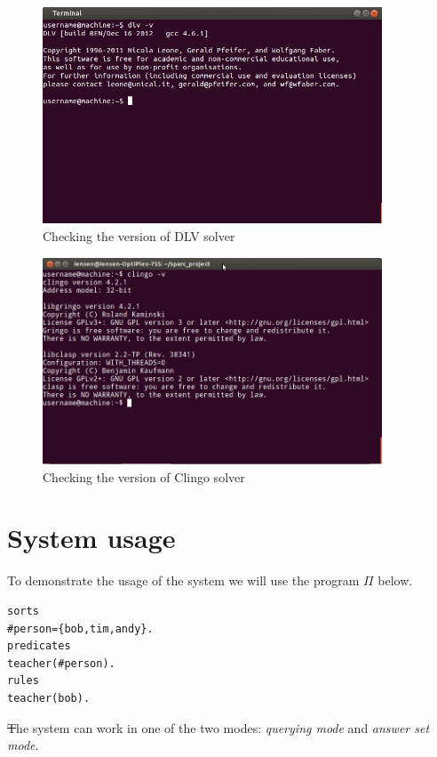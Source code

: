 \documentclass[12pt, letterpaper]{article}
\begin{document}
\begin{figure}[p]
\centering
\includegraphics[width=0.9\textwidth]{dlv_version.jpg}
\caption{Checking the version of DLV solver}
\label{fig:dlv_solver_check}
\end{figure}


\begin{figure}[p]
\centering
\includegraphics[width=0.9\textwidth]{clingo_version.jpg}
\caption{Checking the version of Clingo solver}
\label{fig:clingo_solver_check}
\end{figure}

\section{System usage}

To demonstrate the usage of the system we will use the program $\Pi$ below.
\begin{verbatim}
sorts
#person={bob,tim,andy}.
predicates
teacher(#person).
rules
teacher(bob).
\end{verbatim}

\st
The system can work in one of the  two modes: \textit{querying mode} and \textit{answer set mode}.
\end{document}
